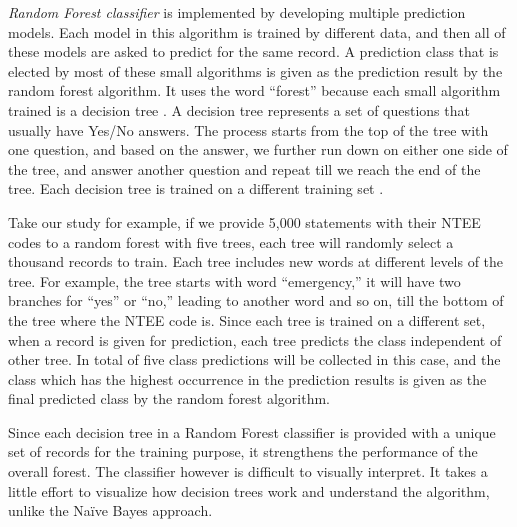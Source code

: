 \documentclass[11pt]{article}
\begin{document}



\textit{Random Forest classifier} is implemented by developing multiple prediction models. Each model in this algorithm is trained by different data, and then all of these models are asked to predict for the same record. A prediction class that is elected by most of these small algorithms is given as the prediction result by the random forest algorithm. It uses the word ``forest'' because each small algorithm trained is a decision tree \parencites[83]{QuinlanInductiondecisiontrees1986}. A decision tree represents a set of questions that usually have Yes/No answers. The process starts from the top of the tree with one question, and based on the answer, we further run down on either one side of the tree, and answer another question and repeat till we reach the end of the tree. Each decision tree is trained on a different training set \parencites[124]{BreimanBaggingpredictors1996}. 

Take our study for example, if we provide 5,000 statements with their NTEE codes to a random forest with five trees, each tree will randomly select a thousand records to train. Each tree includes new words at different levels of the tree. For example, the tree starts with word ``emergency,'' it will have two branches for ``yes'' or ``no,'' leading to another word and so on, till the bottom of the tree where the NTEE code is. Since each tree is trained on a different set, when a record is given for prediction, each tree predicts the class independent of other tree. In total of five class predictions will be collected in this case, and the class which has the highest occurrence in the prediction results is given as the final predicted class by the random forest algorithm. 

Since each decision tree in a Random Forest classifier is provided with a unique set of records for the training purpose, it strengthens the performance of the overall forest. The classifier however is difficult to visually interpret. It takes a little effort to visualize how decision trees work and understand the algorithm, unlike the Na\"ive Bayes approach.
\end{document}
